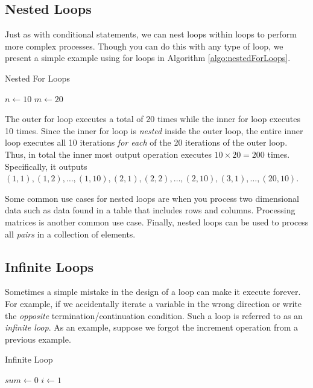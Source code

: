 \subsection{Nested Loops}

Just as with conditional statements, we can nest loops within loops to perform
more complex processes.  Though you can do this with any type of loop, we 
present a simple example using for loops in Algorithm \ref{algo:nestedForLoops}.

\begin{algorithm}[h]
\caption{Nested For Loops}
\label{algo:nestedForLoops}
$n \leftarrow 10$ \;
$m \leftarrow 20$ \;
\end{algorithm}

The outer for loop executes a total of 20 times while the inner for loop 
executes 10 times.  Since the inner for loop is \emph{nested} inside the 
outer loop, the entire inner loop executes all 10 iterations \emph{for each}
of the 20 iterations of the outer loop.  Thus, in total the inner most output
operation executes $10 \times 20 = 200$ times.  Specifically, it outputs 
$(1, 1), (1, 2), \ldots, (1, 10), (2, 1), (2, 2), \ldots, (2, 10), (3, 1), \ldots, (20, 10)$.

Some common  use cases for nested loops are when you process two dimensional data
such as data found in a table that includes rows and columns.  Processing matrices
is another common use case.  Finally, nested loops can be used to process all \emph{pairs}
in a collection of elements.

\subsection{Infinite Loops}
\label{subsection:infiniteLoops}

Sometimes a simple mistake in the design of a loop can make it execute forever.  
For example, if we accidentally iterate a variable in the wrong direction or write the
\emph{opposite} termination/continuation condition.  Such a loop is referred to as 
an \emph{infinite loop}.  As an example, suppose we forgot the increment operation
from a previous example.

\begin{algorithm}[h]
\caption{Infinite Loop}
\label{algo:infiniteLoop}
$sum \leftarrow 0$ \;
$i \leftarrow 1$ \;
\end{algorithm}

